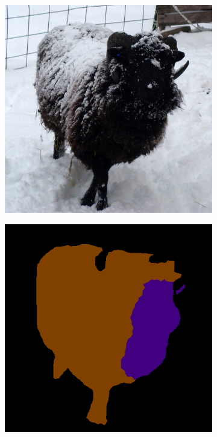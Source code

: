 \documentclass{article} %
\begin{document}
\begin{figure}[t]
\begin{subfigure}[b]{0.19\linewidth}
  \end{subfigure}

  \begin{subfigure}[b]{0.19\linewidth}
    \includegraphics[width=\textwidth]{figs/ab/img/2009_001991}
  \end{subfigure}
  \begin{subfigure}[b]{0.19\linewidth}
    \includegraphics[width=\textwidth]{figs/ab/step8/2009_001991}

\end{subfigure}
\end{figure}
\end{document}
